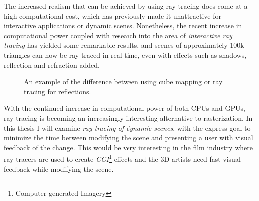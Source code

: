 


The increased realism that can be achieved by using ray tracing does come at a
high computational cost, which has previously made it unattractive for
interactive applications or dynamic scenes. Nonetheless, the recent increase in
computational power coupled with research into the area of \textit{interactive
  ray tracing} has yielded some remarkable results, and scenes of approximately
100k triangles can now be ray traced in real-time, even with effects such as
shadows, reflection and refraction added.

\begin{figure}
  \centering
  \hspace{10pt}
  \caption[Reflections created with cube mapping and ray tracing.]{An example of
    the difference between using cube mapping or ray tracing for
    reflections.}
  \label{fig:reflectingDragons}
\end{figure}



With the continued increase in computational power of both CPUs and GPUs, ray
tracing is becoming an increasingly interesting alternative to rasterization. In
this thesis I will examine \textit{ray tracing of dynamic scenes}, with the
express goal to minimize the time between modifying the scene and presenting a
user with visual feedback of the change. This would be very interesting in the
film industry where ray tracers are used to create
\textit{CGI}\footnote{Computer-generated Imagery} effects and the 3D artists
need fast visual feedback while modifying the scene.


